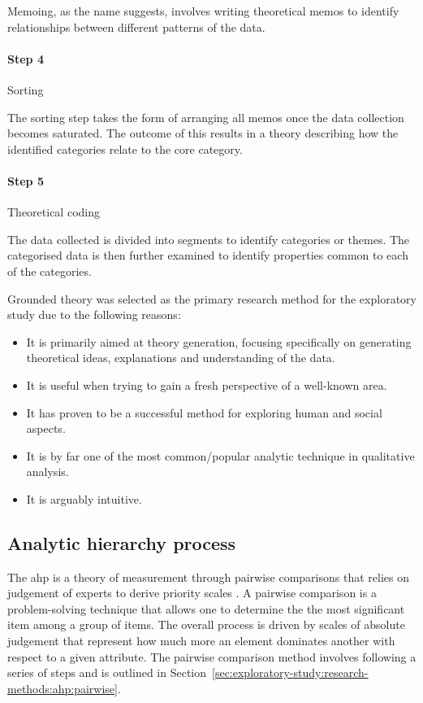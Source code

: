 Memoing, as the name suggests, involves writing theoretical memos to identify
relationships between different patterns of the data.

\paragraph{Step 4} Sorting

The sorting step takes the form of arranging all memos once the data collection
becomes saturated. The outcome of this results in a theory describing how the
identified categories relate to the core category.

\paragraph{Step 5} Theoretical coding

The data collected is divided into segments to identify categories or themes.
The categorised data is then further examined to identify properties common to
each of the categories.

Grounded theory was selected as the primary research method for the exploratory
study due to the following reasons:

\begin{itemize}
 \item It is primarily aimed at theory generation, focusing specifically on
generating theoretical ideas, explanations and understanding of the data.
 \item It is useful when trying to gain a fresh perspective of a
well-known area.
  \item It has proven to be a successful method for exploring human and social
aspects.
  \item It is by far one of the most common/popular analytic technique in
qualitative analysis.
  \item It is arguably intuitive.
\end{itemize}


\subsection{Analytic hierarchy process}
\label{sec:exploratory-study:ahp}

The \gls{ahp} is a theory of measurement through
pairwise comparisons that relies on judgement of experts to derive priority scales
\citep{Saaty2008}. A pairwise comparison is a problem-solving technique that
allows one to determine the the most significant item among a group of items. The overall
process is driven by scales of absolute judgement that represent how much more
an element dominates another with respect to a given attribute. The pairwise
comparison method involves following a series of steps and is outlined in
Section~\ref{sec:exploratory-study:research-methods:ahp:pairwise}.

